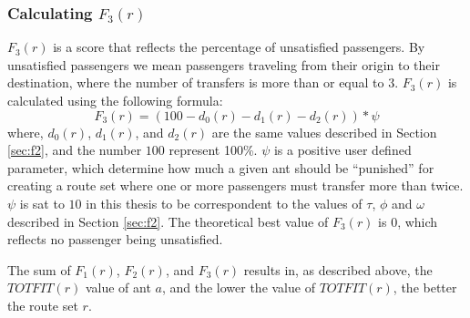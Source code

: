 \subsubsection{Calculating $F_{3}(r)$}
\label{sec:f3}
$F_3(r)$ is a score that reflects the percentage of unsatisfied passengers. By unsatisfied passengers we mean passengers traveling from their origin to their destination, where the number of transfers is more than or equal to 3. $F_3(r)$ is calculated using the following formula:
\newline
$$F_3(r) = (100 - d_0(r) - d_1(r) - d_2(r))*\psi$$
\newline
where, $d_0(r)$, $d_1(r)$, and $d_2(r)$ are the same values described in Section \vref{sec:f2}, and the number $100$ represent 100\%. $\psi$ is a positive user defined parameter, which determine how much a given ant should be ``punished'' for creating a route set where one or more passengers must transfer more than twice. $\psi$ is sat to $10$ in this thesis to be correspondent to the values of $\tau$, $\phi$ and $\omega$ described in Section \vref{sec:f2}. The theoretical best value of $F_3(r)$ is 0, which reflects no passenger being unsatisfied. 

The sum of $F_{1}(r)$, $F_{2}(r)$, and $F_{3}(r)$ results in, as described above, the $TOTFIT(r)$ value of ant $a$, and the lower the value of $TOTFIT(r)$, the better the route set $r$. 


